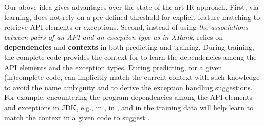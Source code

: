 
Our above idea gives {\tool} advantages over the state-of-the-art IR
approach. First,
via learning, {\tool} does not rely on a pre-defined threshold for
explicit feature matching to retrieve API elements or
exceptions. Second, instead of using {\em the associations between
  pairs of an API and an exception type as in XRank},
{\tool} relies on {\bf dependencies} and {\bf contexts}
in both predicting and training. During training, the complete code
provides the context for {\tool} to learn the dependencies among the
API elements and the exception types. During predicting, for a given
(in)complete code, {\tool} can implicitly match the current context
with such knowledge to avoid the name ambiguity and to derive the
exception handling suggestions.
%
For example, encountering the program dependencies among the API
elements and exceptions in JDK, e.g.,  in
,  in
, and
 in the training data will help
     {\tool} learn to match the context in a given code to suggest
     .



